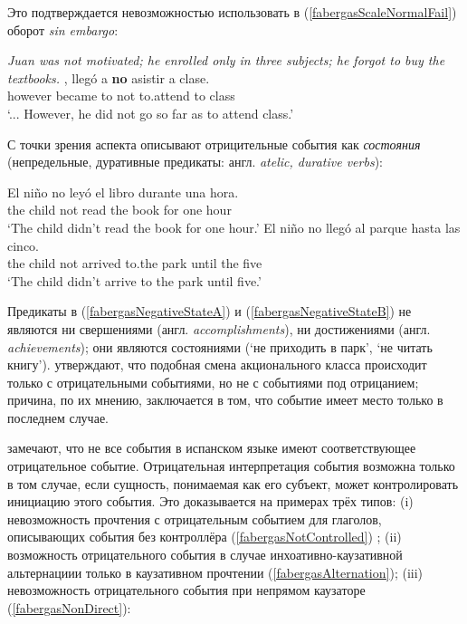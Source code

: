\documentclass[a4paper, titlepage]{article}
\begin{document}
Это подтверждается невозможностью использовать в (\ref{fabergasScaleNormalFail}) оборот \textit{sin embargo}:

\begin{exe}
    \ex \label{fabergasScaleNormalFail} {\small \textit{Juan was not motivated; he enrolled only in three subjects; he forgot to buy the textbooks.}}
        , llegó a \textbf{no} asistir a clase. \\
             however became to not to.attend to class \\
        \glt `... However, he did not go so far as to attend class.'
\end{exe}

С точки зрения аспекта \citep{fabergas2017building} описывают отрицительные события как \textit{состояния} (непредельные, дуративные предикаты: англ. \textit{atelic, durative verbs}):

\begin{exe}
    \ex \label{fabergasNegativeState} \begin{xlist}
        \ex \label{fabergasNegativeStateA} 
            \gll El niño no leyó el libro durante una hora. \\
                 the child not read the book for one hour \\
            \glt `The child didn’t read the book for one hour.'
        \ex \label{fabergasNegativeStateB}
            \gll El niño no llegó al parque hasta las cinco. \\
                 the child not arrived to.the park until the five \\
            \glt `The child didn’t arrive to the park until five.'
    \end{xlist}
\end{exe}

Предикаты в (\ref{fabergasNegativeStateA}) и (\ref{fabergasNegativeStateB}) не являются ни свершениями (англ. \textit{accomplishments}), ни достижениями (англ. \textit{achievements}); они являются состояниями (`не приходить в парк', `не читать книгу'). \citep{fabergas2017building} утверждают, что подобная смена акционального класса происходит только с отрицательными событиями, но не с событиями под отрицанием; причина, по их мнению, заключается в том, что событие имеет место только в последнем случае.

\medskip

\citep{fabergas2017building} замечают, что не все события в испанском языке имеют соответствующее отрицательное событие. Отрицательная интерпретация события возможна только в том случае, если сущность, понимаемая как его субъект, может контролировать инициацию этого события. Это доказывается на примерах трёх типов: (i) невозможность прочтения с отрицательным событием для глаголов, описывающих события без контроллёра (\ref{fabergasNotControlled}) ; (ii) возможность отрицательного события в случае инхоативно-каузативной альтернациии только в каузативном прочтении (\ref{fabergasAlternation}); (iii) невозможность отрицательного события при непрямом каузаторе (\ref{fabergasNonDirect}):
\end{document}
